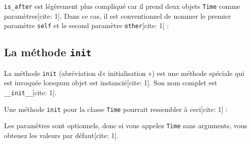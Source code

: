 \texttt{is\_after} est légèrement plus compliqué car il prend deux
objets \texttt{Time} comme paramètres{[}cite: 1{]}. Dans ce cas, il est
conventionnel de nommer le premier paramètre \texttt{self} et le second
paramètre \texttt{other}{[}cite: 1{]} :

\begin{Shaded}
\begin{Highlighting}[]

     \OperatorTok{\textgreater{}}
\end{Highlighting}
\end{Shaded}

\hypertarget{la-muxe9thode-init}{%
\subsection{\texorpdfstring{La méthode
\texttt{init}}{La méthode init}}\label{la-muxe9thode-init}}

La méthode \texttt{init} (abréviation d\textquotesingle« initialisation
») est une méthode spéciale qui est invoquée lorsqu\textquotesingle un
objet est instancié{[}cite: 1{]}. Son nom complet est
\texttt{\_\_init\_\_}{[}cite: 1{]}.

Une méthode \texttt{init} pour la classe \texttt{Time} pourrait
ressembler à ceci{[}cite: 1{]} :

\begin{Shaded}
\begin{Highlighting}[]

 \NormalTok{(}\OperatorTok{=}\OperatorTok{=}\OperatorTok{=}\NormalTok{):}
    \OperatorTok{=}
    \OperatorTok{=}
    \OperatorTok{=}
\end{Highlighting}
\end{Shaded}

Les paramètres sont optionnels, donc si vous appelez \texttt{Time} sans
arguments, vous obtenez les valeurs par défaut{[}cite: 1{]}.

